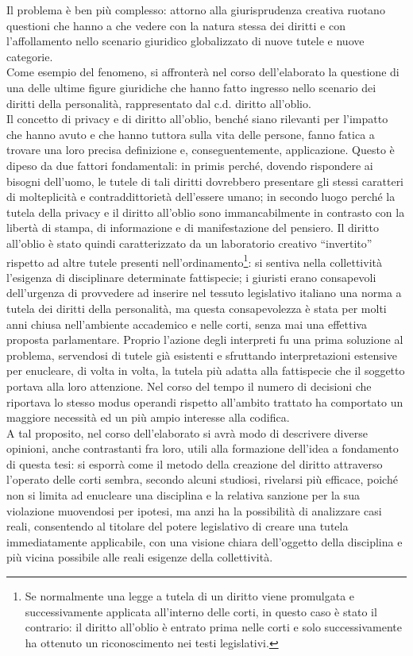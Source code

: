 Il problema è ben più complesso: attorno alla giurisprudenza creativa ruotano questioni che hanno a che vedere con la natura stessa dei diritti e con l'affollamento nello scenario giuridico globalizzato di nuove tutele e nuove categorie. 
\\Come esempio del fenomeno, si affronterà nel corso dell'elaborato la questione di una delle ultime figure giuridiche che hanno fatto ingresso nello scenario dei diritti della personalità, rappresentato dal c.d. diritto all'oblio. 
\\Il concetto di privacy e di diritto all’oblio, benché siano rilevanti per l'impatto che hanno avuto e che hanno tuttora sulla vita delle persone, fanno fatica a trovare una loro precisa definizione e, conseguentemente, applicazione. Questo è dipeso da due fattori fondamentali: in primis perché, dovendo rispondere ai bisogni dell’uomo, le tutele di tali diritti dovrebbero presentare gli stessi caratteri di molteplicità e contraddittorietà dell'essere umano; in secondo luogo perché la tutela della privacy e il diritto all'oblio sono immancabilmente in contrasto con la libertà di stampa, di informazione e di manifestazione del pensiero.
Il diritto all'oblio è stato quindi caratterizzato da un laboratorio creativo “invertito” rispetto ad altre tutele presenti nell’ordinamento\footnote{Se normalmente una legge a tutela di un diritto viene promulgata e successivamente applicata all’interno delle corti, in questo caso è stato il contrario: il diritto all’oblio è entrato prima nelle corti e solo successivamente ha ottenuto un riconoscimento nei testi legislativi.}: si sentiva nella collettività l'esigenza di disciplinare determinate fattispecie; i giuristi erano consapevoli dell'urgenza di provvedere ad inserire nel tessuto legislativo italiano una norma a tutela dei diritti della personalità, ma questa consapevolezza è stata per molti anni chiusa nell'ambiente accademico e nelle corti, senza mai una effettiva proposta parlamentare.
Proprio l'azione degli interpreti fu una prima soluzione al problema, servendosi di tutele già esistenti e sfruttando interpretazioni estensive per enucleare, di volta in volta, la tutela più adatta alla fattispecie che il soggetto portava alla loro attenzione.
Nel corso del tempo il numero di decisioni che riportava lo stesso modus operandi rispetto all’ambito trattato ha comportato un maggiore necessità ed un più ampio interesse alla codifica.
\\A tal proposito, nel corso dell'elaborato si avrà modo di descrivere diverse opinioni, anche contrastanti fra loro, utili alla formazione dell'idea a fondamento di questa tesi: si esporrà come il metodo della creazione del diritto attraverso l'operato delle corti sembra, secondo alcuni studiosi, rivelarsi più efficace, poiché non si limita ad enucleare una disciplina e la relativa sanzione per la sua violazione muovendosi per ipotesi, ma anzi ha la possibilità di analizzare casi reali, consentendo al titolare del potere legislativo di creare una tutela immediatamente applicabile, con una visione chiara dell'oggetto della disciplina e più vicina possibile alle reali esigenze della collettività.
